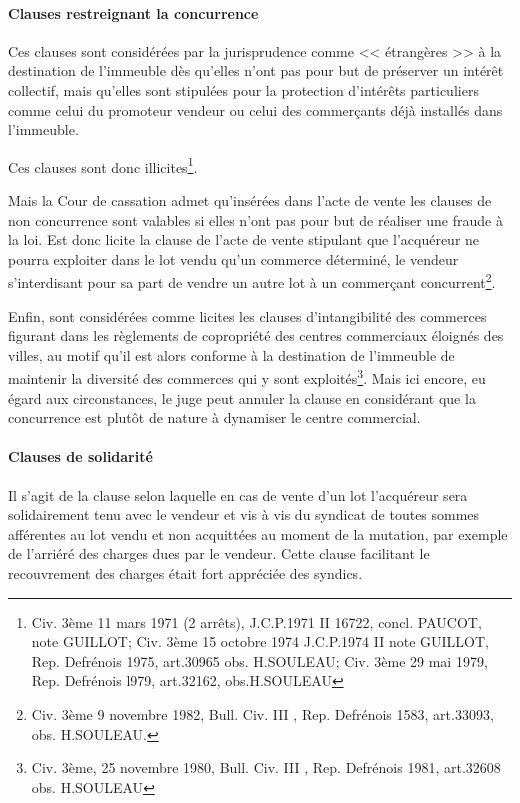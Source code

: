 			\paragraph{Clauses restreignant la concurrence}
			
			Ces clauses sont considérées par la jurisprudence comme << étrangères >> à la destination de l'immeuble dès qu’elles n'ont pas pour but de préserver un intérêt collectif, mais qu'elles sont stipulées pour la protection d'intérêts particuliers comme celui du promoteur vendeur ou celui des commerçants déjà installés dans l'immeuble.
			
			Ces clauses sont donc illicites\footnote{Civ. 3ème 11 mars 1971 (2 arrêts), J.C.P.1971 II 16722, concl. PAUCOT, note GUILLOT; Civ. 3ème 15 octobre 1974 J.C.P.1974 II note GUILLOT, Rep. Defrénois 1975, art.30965 obs. H.SOULEAU; Civ. 3ème 29 mai 1979, Rep. Defrénois l979, art.32162, obs.H.SOULEAU}.
			
			Mais la Cour de cassation admet qu'insérées dans l'acte de vente les clauses de non concurrence sont valables si elles n'ont pas pour but de réaliser une fraude à la loi. Est donc licite la clause de l'acte de vente stipulant que l'acquéreur ne pourra exploiter dans le lot vendu qu'un commerce déterminé, le vendeur s'interdisant pour sa part de vendre un autre lot à un commerçant concurrent\footnote{Civ. 3ème 9 novembre 1982, Bull. Civ. III , Rep. Defrénois 1583, art.33093, obs. H.SOULEAU.}.
			
			Enfin, sont considérées comme licites les clauses d'intangibilité des commerces figurant dans les règlements de copropriété des centres commerciaux éloignés des villes, au motif qu'il est alors conforme à la destination de l'immeuble de maintenir la diversité des commerces qui y sont exploités\footnote{Civ. 3ème, 25 novembre 1980, Bull. Civ. III , Rep. Defrénois 1981, art.32608 obs. H.SOULEAU}. Mais ici encore, eu égard aux circonstances, le juge peut annuler la clause en considérant que la concurrence est plutôt de nature à dynamiser le centre commercial.
			
			\paragraph{Clauses de solidarité}

			Il s'agit de la clause selon laquelle en cas de vente d'un lot l'acquéreur sera solidairement tenu avec le vendeur et vis à vis du syndicat de toutes sommes afférentes au lot vendu et non acquittées au moment de la mutation, par exemple de l'arriéré des charges dues par le vendeur. Cette clause facilitant le recouvrement des charges était fort appréciée des syndics.
			

